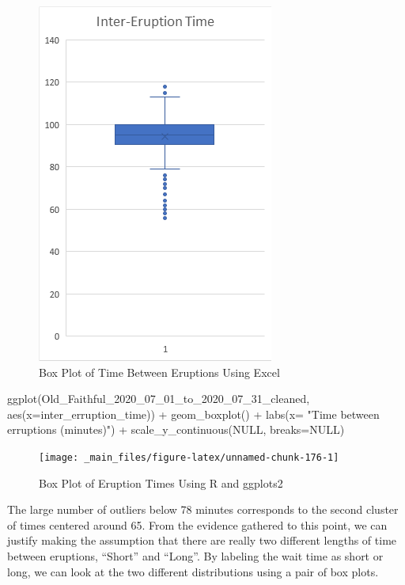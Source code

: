 \documentclass[
]{book}
\newenvironment{Shaded}{\begin{snugshade}}{\end{snugshade}}
\newcommand{\AttributeTok}[1]{\textcolor[rgb]{0.77,0.63,0.00}{#1}}
\newcommand{\ConstantTok}[1]{\textcolor[rgb]{0.00,0.00,0.00}{#1}}
\newcommand{\FunctionTok}[1]{\textcolor[rgb]{0.00,0.00,0.00}{#1}}
\newcommand{\NormalTok}[1]{#1}
\newcommand{\SpecialCharTok}[1]{\textcolor[rgb]{0.00,0.00,0.00}{#1}}
\newcommand{\StringTok}[1]{\textcolor[rgb]{0.31,0.60,0.02}{#1}}
\theoremstyle{definition}
\theoremstyle{definition}
\theoremstyle{definition}
\theoremstyle{definition}
\theoremstyle{remark}
\begin{document}
\begin{figure}

{\centering \includegraphics[width=0.3\linewidth]{data-examples/Old-Faithful/Eruption-Box-Excel} 

}

\caption{Box Plot of Time Between Eruptions Using Excel}\label{fig:unnamed-chunk-175}
\end{figure}

\begin{Shaded}
\begin{Highlighting}[]
\FunctionTok{ggplot}\NormalTok{(Old\_Faithful\_2020\_07\_01\_to\_2020\_07\_31\_cleaned, }\FunctionTok{aes}\NormalTok{(}\AttributeTok{x=}\NormalTok{inter\_erruption\_time)) }\SpecialCharTok{+} \FunctionTok{geom\_boxplot}\NormalTok{() }\SpecialCharTok{+} \FunctionTok{labs}\NormalTok{(}\AttributeTok{x=} \StringTok{"Time between erruptions (minutes)"}\NormalTok{) }\SpecialCharTok{+} \FunctionTok{scale\_y\_continuous}\NormalTok{(}\ConstantTok{NULL}\NormalTok{, }\AttributeTok{breaks=}\ConstantTok{NULL}\NormalTok{)}
\end{Highlighting}
\end{Shaded}

\begin{figure}

{\centering \texttt{[image: \_main\_files/figure-latex/unnamed-chunk-176-1]} 

}

\caption{Box Plot of Eruption Times Using R and ggplots2}\label{fig:unnamed-chunk-176}
\end{figure}

The large number of outliers below 78 minutes corresponds to the second cluster of times centered around 65. From the evidence gathered to this point, we can justify making the assumption that there are really two different lengths of time between eruptions, ``Short'' and ``Long''. By labeling the wait time as short or long, we can look at the two different distributions using a pair of box plots.
\end{document}
